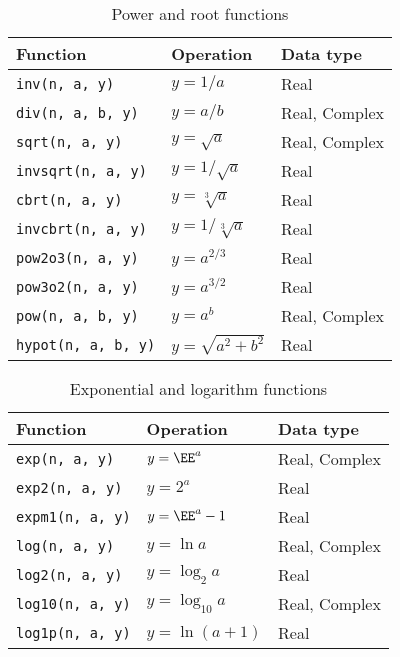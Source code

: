 \begin{table}
  \begin{tabularx}{\textwidth}{LLL}
    \toprule
    Function & Operation & Data type \\
    \midrule
    \texttt{inv(n, a, y)}      & $y = 1 / a$            & Real          \\
    \texttt{div(n, a, b, y)}   & $y = a / b$            & Real, Complex \\
    \texttt{sqrt(n, a, y)}     & $y = \sqrt{a}$         & Real, Complex \\
    \texttt{invsqrt(n, a, y)}  & $y = 1 / \sqrt{a}$     & Real          \\
    \texttt{cbrt(n, a, y)}     & $y = \sqrt[3]{a}$      & Real          \\
    \texttt{invcbrt(n, a, y)}  & $y = 1 / \sqrt[3]{a}$  & Real          \\
    \texttt{pow2o3(n, a, y)}   & $y = a^{2/3}$          & Real          \\
    \texttt{pow3o2(n, a, y)}   & $y = a^{3/2}$          & Real          \\
    \texttt{pow(n, a, b, y)}   & $y = a^b$              & Real, Complex \\
    \texttt{hypot(n, a, b, y)} & $y = \sqrt{a^2 + b^2}$ & Real          \\
    \bottomrule
  \end{tabularx}
  \caption{Power and root functions}
  \label{tab:Power and root functions}
\end{table}

\begin{table}
  \begin{tabularx}{\textwidth}{LLL}
    \toprule
    Function & Operation & Data type \\
    \midrule
    \texttt{exp(n, a, y)}   & $y = \EE^a$       & Real, Complex \\
    \texttt{exp2(n, a, y)}  & $y = 2^a$         & Real          \\
    \texttt{expm1(n, a, y)} & $y = \EE^a - 1$   & Real          \\
    \texttt{log(n, a, y)}   & $y = \ln a$       & Real, Complex \\
    \texttt{log2(n, a, y)}  & $y = \log_2 a$    & Real          \\
    \texttt{log10(n, a, y)} & $y = \log_{10} a$ & Real, Complex \\
    \texttt{log1p(n, a, y)} & $y = \ln(a + 1)$  & Real          \\
    \bottomrule
  \end{tabularx}
  \caption{Exponential and logarithm functions}
  \label{tab:Exponential and logarithm functions}
\end{table}

